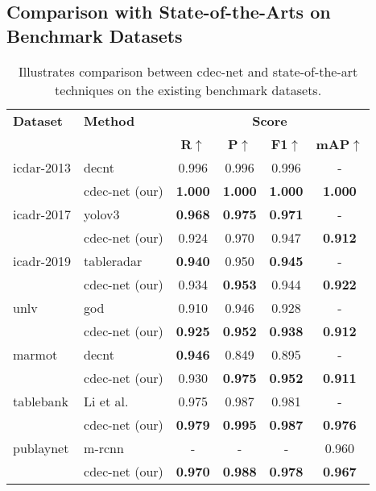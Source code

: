 \documentclass[a4paper,conference]{IEEEtran}
\begin{document}
\subsection{Comparison with State-of-the-Arts on Benchmark Datasets}

\begin{table}[ht!]
\begin{center}
\begin{tabular}{|l|l|c c c c|} \hline
\textbf{Dataset} &\textbf{Method} &\multicolumn{4}{|c|}{\textbf{Score}} \\ \cline{3-6}
 &  &\textbf{R}$\uparrow$ &\textbf{P}$\uparrow$ &\textbf{F1}$\uparrow$ &\textbf{mAP}$\uparrow$ \\ \hline 
{\sc icdar-2013} &{\sc d}e{\sc cnt}~\cite{siddiqui2018decnt} &0.996 &0.996 &0.996 &- \\
 &{\sc cd}e{\sc c-n}et (our) &\textbf{1.000} &\textbf{1.000} &\textbf{1.000} &\textbf{1.000} \\ \hline
{\sc icadr-2017} &{\sc yolo}v3~\cite{huang2019yolo} &\textbf{0.968} &\textbf{0.975} &\textbf{0.971} &- \\
&{\sc cd}e{\sc c-n}et (our) &0.924 &0.970 &0.947 &\textbf{0.912} \\  \hline
{\sc icadr-2019} &{\sc t}able{\sc r}adar~\cite{gao2019icdar} &\textbf{0.940} &0.950 &\textbf{0.945} &- \\
 &{\sc cd}e{\sc c-n}et (our) &0.934 &\textbf{0.953} &0.944 &\textbf{0.922} \\ \hline 
{\sc unlv} &{\sc god}~\cite{saha2019graphical} &0.910 &0.946 &0.928 &- \\ 
 &{\sc cd}e{\sc c-n}et (our) &\textbf{0.925} &\textbf{0.952} &\textbf{0.938} & \textbf{0.912} \\ \hline
{\sc m}armot &{\sc d}e{\sc cnt}~\cite{siddiqui2018decnt} &\textbf{0.946} &0.849 &0.895 &- \\ 
&{\sc cd}e{\sc c-n}et (our) &0.930 &\textbf{0.975} &\textbf{0.952} &\textbf{0.911} \\ \hline
{\sc t}able{\sc b}ank &Li et al.~\cite{li2019tablebank} &0.975 &0.987 &0.981 &- \\
 &{\sc cd}e{\sc c-n}et (our) & \textbf{0.979} & \textbf{0.995} & \textbf{0.987} & \textbf{0.976}\\ \hline
{\sc p}ub{\sc l}ay{\sc n}et &{\sc m-rcnn}~\cite{zhong2019publaynet} &- & -&- &0.960 \\ 
 &{\sc cd}e{\sc c-n}et (our) & \textbf{0.970} & \textbf{0.988} & \textbf{0.978} & \textbf{0.967}  \\ \hline
 \end{tabular}
\end{center}
\caption{Illustrates comparison between {\sc cd}e{\sc c-n}et and state-of-the-art techniques on the existing benchmark datasets. \label{comparion_table}}
\end{table}
\end{document}
